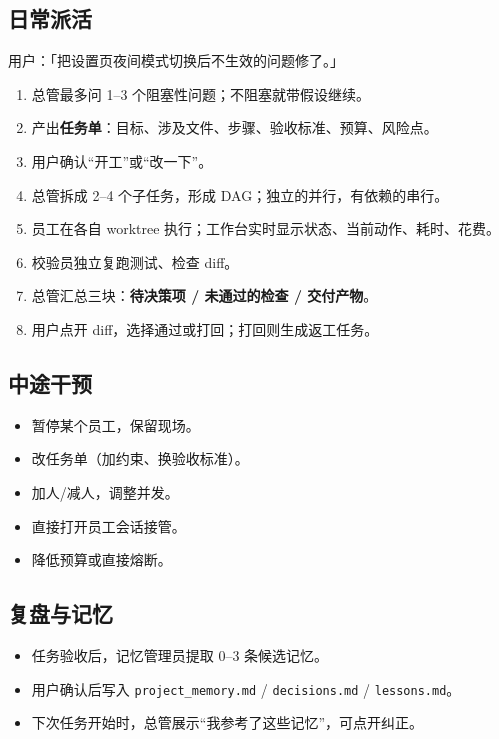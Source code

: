 \documentclass[UTF8,11pt,a4paper,fontset=windows]{ctexart}
\let\ocsubsection\subsection
\renewcommand{\subsection}{\Needspace{5\baselineskip}\ocsubsection}
\newcommand{\code}[1]{\texttt{#1}}
\begin{document}
\subsection{日常派活}

\begin{notebox}[一个典型请求]
用户：「把设置页夜间模式切换后不生效的问题修了。」
\end{notebox}

\begin{enumerate}
  \item 总管最多问 1--3 个阻塞性问题；不阻塞就带假设继续。
  \item 产出\textbf{任务单}：目标、涉及文件、步骤、验收标准、预算、风险点。
  \item 用户确认“开工”或“改一下”。
  \item 总管拆成 2--4 个子任务，形成 DAG；独立的并行，有依赖的串行。
  \item 员工在各自 worktree 执行；工作台实时显示状态、当前动作、耗时、花费。
  \item 校验员独立复跑测试、检查 diff。
  \item 总管汇总三块：\textbf{待决策项 / 未通过的检查 / 交付产物}。
  \item 用户点开 diff，选择通过或打回；打回则生成返工任务。
\end{enumerate}

\subsection{中途干预}

\begin{itemize}
  \item 暂停某个员工，保留现场。
  \item 改任务单（加约束、换验收标准）。
  \item 加人/减人，调整并发。
  \item 直接打开员工会话接管。
  \item 降低预算或直接熔断。
\end{itemize}

\subsection{复盘与记忆}

\begin{itemize}
  \item 任务验收后，记忆管理员提取 0--3 条候选记忆。
  \item 用户确认后写入 \code{project\_memory.md} / \code{decisions.md} / \code{lessons.md}。
  \item 下次任务开始时，总管展示“我参考了这些记忆”，可点开纠正。
\end{itemize}
\end{document}
